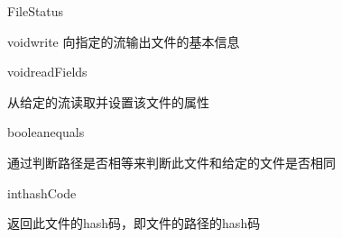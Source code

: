 \begin{XeClass}{FileStatus}
\begin{XeMethod}{\XePublic}{void}{write}
 向指定的流输出文件的基本信息

    \end{XeMethod}

    \begin{XeMethod}{\XePublic}{void}{readFields}
         
 从给定的流读取并设置该文件的属性

    \end{XeMethod}

    \begin{XeMethod}{\XePublic}{boolean}{equals}
         
 通过判断路径是否相等来判断此文件和给定的文件是否相同

    \end{XeMethod}

    \begin{XeMethod}{\XePublic}{int}{hashCode}
         
 返回此文件的hash码，即文件的路径的hash码

    \end{XeMethod}

\end{XeClass}
